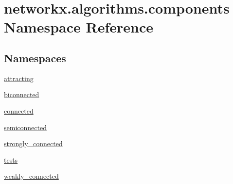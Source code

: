 \hypertarget{namespacenetworkx_1_1algorithms_1_1components}{}\section{networkx.\+algorithms.\+components Namespace Reference}
\label{namespacenetworkx_1_1algorithms_1_1components}
\subsection*{Namespaces}
\begin{DoxyCompactItemize}
\item 
 \hyperlink{namespacenetworkx_1_1algorithms_1_1components_1_1attracting}{attracting}
\item 
 \hyperlink{namespacenetworkx_1_1algorithms_1_1components_1_1biconnected}{biconnected}
\item 
 \hyperlink{namespacenetworkx_1_1algorithms_1_1components_1_1connected}{connected}
\item 
 \hyperlink{namespacenetworkx_1_1algorithms_1_1components_1_1semiconnected}{semiconnected}
\item 
 \hyperlink{namespacenetworkx_1_1algorithms_1_1components_1_1strongly__connected}{strongly\+\_\+connected}
\item 
 \hyperlink{namespacenetworkx_1_1algorithms_1_1components_1_1tests}{tests}
\item 
 \hyperlink{namespacenetworkx_1_1algorithms_1_1components_1_1weakly__connected}{weakly\+\_\+connected}
\end{DoxyCompactItemize}
